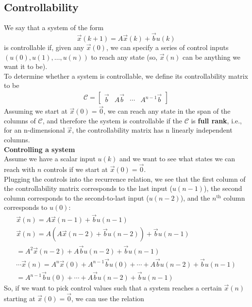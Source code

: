 \subsection*{Controllability}
We say that a system of the form
$$\vec{x}(k + 1) = A\vec{x}(k) + \vec{b} u(k)$$
is controllable if, given any $\vec{x}(0)$, we can specify a series of control inputs $(u(0), u(1), \dots, u(n))$ to reach any state (so, $\vec{x}(n)$ can be anything we want it to be). \\
To determine whether a system is controllable, we define its controllability matrix to be
\begin{align*}
    \mathcal{C} = \begin{bmatrix}
        \vec{b} & A\vec{b} & \cdots & A^{n - 1} \vec{b}
    \end{bmatrix}
\end{align*}
Assuming we start at $\vec{x}(0) = \vec{0}$, we can reach any state in the span of the columns of $\mathcal{C}$, and therefore the system is controllable if the $\mathcal{C}$ is \textbf{full rank}, i.e., for an n-dimensional $\vec{x}$, the controllability matrix has n linearly independent columns. \\
\newline
\textbf{Controlling a system} \\
Assume we have a scalar input $u(k)$ and we want to see what states we can reach with $n$ controls if we start at $\vec{x}(0) = \vec{0}$. \\ 
\newline
Plugging the controls into the recurrence relation, we see that the first column of the controllability matrix corresponds to the last input ($u(n - 1)$), the second column corresponds to the second-to-last input ($u(n - 2)$), and the $n^{\text{th}}$ column corresponds to $u(0)$: 
\begin{align*}
    \vec{x}(n) = A\vec{x}(n - 1) + \vec{b} u(n - 1) \\
    \vec{x}(n) = A(A \vec{x}(n - 2) + \vec{b} u(n - 2)) + \vec{b} u(n - 1) \\
    = A^2 \vec{x}(n - 2) + A\vec{b} u(n - 2) + \vec{b} u(n - 1) \\
    \cdots
    \vec{x}(n) = A^n \vec{x}(0) + A^{n - 1} \vec{b} u(0) + \cdots +  A\vec{b} u(n - 2) + \vec{b} u(n - 1) \\
    = A^{n - 1} \vec{b} u(0) + \cdots +  A\vec{b} u(n - 2) + \vec{b} u(n - 1)
\end{align*}
So, if we want to pick control values such that a system reaches a certain $\vec{x}(n)$ starting at $\vec{x}(0) = \vec{0}$, we can use the relation
